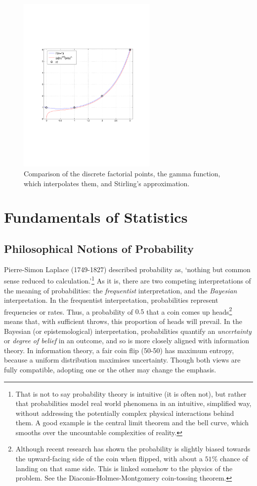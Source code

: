 \documentclass[11pt]{amsart}
\begin{document}
\begin{figure}[!ht]
\centering
\includegraphics[width=0.6\textwidth]{Figures/factorial.pdf}
\caption{Comparison of the discrete factorial points, the gamma function, which interpolates them, and Stirling's approximation.}
\label{fig:factorial}
\end{figure}

\section{Fundamentals of Statistics}
\subsection{Philosophical Notions of Probability}

Pierre-Simon Laplace (1749-1827) described probability as, `nothing but common sense reduced to calculation.'\footnote{That is not to say probability theory is intuitive (it is often not), but rather that probabilities model real world phenomena in an intuitive, simplified way, without addressing the potentially complex physical interactions behind them. A good example is the central limit theorem and the bell curve, which smooths over the uncountable complexities of reality.} As it is, there are two competing interpretations of the meaning of probabilities: the \emph{frequentist} interpretation, and the \emph{Bayesian} interpretation. In the frequentist interpretation, probabilities represent frequencies or rates. Thus, a probability of $0.5$ that a coin comes up heads\footnote{Although recent research has shown the probability is slightly biased towards the upward-facing side of the coin when flipped, with about a $51\%$ chance of landing on that same side. This is linked somehow to the physics of the problem. See the Diaconis-Holmes-Montgomery coin-tossing theorem.} means that, with sufficient throws, this proportion of heads will prevail. In the Bayesian (or epistemological) interpretation, probabilities quantify an \emph{uncertainty} or \emph{degree of belief} in an outcome, and so is more closely aligned with information theory. In information theory, a fair coin flip (50-50) has maximum entropy, because a uniform distribution maximises uncertainty. Though both views are fully compatible, adopting one or the other may change the emphasis.
\end{document}
